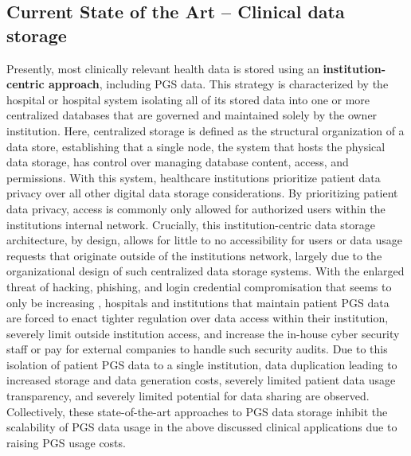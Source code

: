 \documentclass[runningheads]{llncs}
\begin{document}
\subsection{Current State of the Art -- Clinical data storage}
Presently, most clinically relevant health data is stored using an \textbf{institution-centric approach}, including PGS data. 
This strategy is characterized by the hospital or hospital system isolating all of its stored data into one or more centralized databases that are governed and maintained solely by the owner institution. 
Here, centralized storage is defined as the structural organization of a data store, establishing that a single node, the system that hosts the physical data storage, has control over managing database content, access, and permissions. 
With this system, healthcare institutions prioritize patient data privacy over all other digital data storage considerations. 
By prioritizing patient data privacy, access is commonly only allowed for authorized users within the institution\textquotesingle s internal network. 
Crucially, this institution-centric data storage architecture, by design, allows for little to no accessibility for users or data usage requests that originate outside of the institution\textquotesingle s network, largely due to the organizational design of such centralized data storage systems. 
With the enlarged threat of hacking, phishing, and login credential compromisation that seems to only be increasing \cite{noauthor_ransomware_nodate}, hospitals and institutions that maintain patient PGS data are forced to enact tighter regulation over data access within their institution, severely limit outside institution access, and increase the in-house cyber security staff or pay for external companies to handle such security audits.  
Due to this isolation of patient PGS data to a single institution, data duplication leading to increased storage and data generation costs, severely limited patient data usage transparency, and severely limited potential for data sharing are observed. 
Collectively, these state-of-the-art approaches to PGS data storage inhibit the scalability of PGS data usage in the above discussed clinical applications due to raising PGS usage costs.
\end{document}
